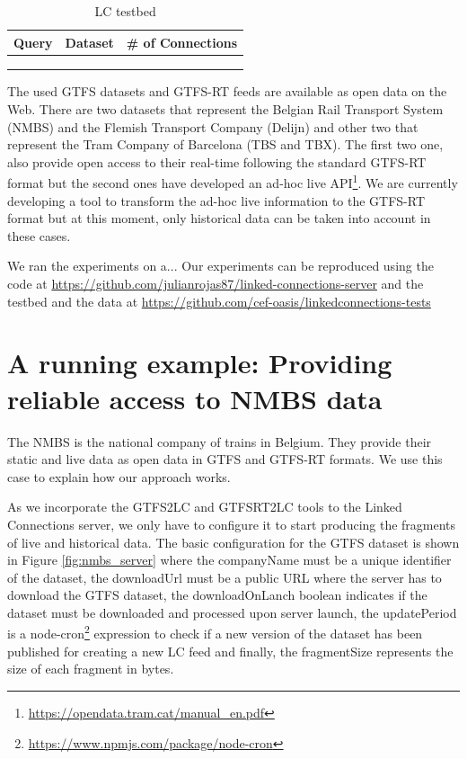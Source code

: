 \documentclass[sw]{iosart2x}
\begin{document}
\begin{table} %
\centering
\label{table:queries}
\begin{tabular}{lll}
\hline
\multicolumn{1}{l|}{\textbf{Query}} & \multicolumn{1}{l|}{\textbf{Dataset}} & \multicolumn{1}{l}{\textbf{\# of Connections}} \\ \hline
                            &                              &                                    \\
                            &                              &                                    \\
                            &                              &                                   
\end{tabular}
\caption{LC testbed} 
\end{table}

The used GTFS datasets and GTFS-RT feeds are available as open data on the Web. There are two datasets that represent the Belgian Rail Transport System (NMBS) and the Flemish Transport Company (Delijn) and other two that represent the Tram Company of Barcelona (TBS and TBX). The first two one, also provide open access to their real-time following the standard GTFS-RT format but the second ones have developed an ad-hoc live API\footnote{\url{https://opendata.tram.cat/manual_en.pdf}}. We are currently developing a tool to transform the ad-hoc live information to the GTFS-RT format but at this moment, only historical data can be taken into account in these cases.

We ran the experiments on a... Our experiments can be reproduced using the code at \url{https://github.com/julianrojas87/linked-connections-server} and the testbed and the data at \url{https://github.com/cef-oasis/linkedconnections-tests}

\section{A running example: Providing reliable access to NMBS data}
The NMBS is the national company of trains in Belgium. They provide their static and live data as open data in GTFS and GTFS-RT formats. We use this case to explain how our approach works.

As we incorporate the GTFS2LC and GTFSRT2LC tools to the Linked Connections server, we only have to configure it to start producing the fragments of live and historical data. The basic configuration for the GTFS dataset is shown in Figure \ref{fig:nmbs_server} where the companyName must be a unique identifier of the dataset, the downloadUrl must be a public URL where the server has to download the GTFS dataset, the downloadOnLanch boolean indicates if the dataset must be downloaded and processed upon server launch, the updatePeriod is a node-cron\footnote{\url{https://www.npmjs.com/package/node-cron}} expression to check if a new version of the dataset has been published for creating a new LC feed and finally, the fragmentSize  represents the size of each fragment in bytes.
\end{document}
